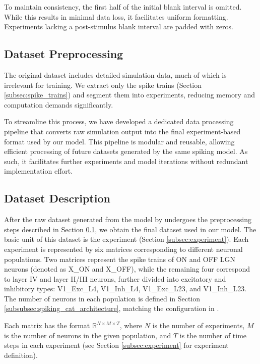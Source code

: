 To maintain consistency, the first half of the initial blank interval is omitted. While this results in minimal data loss, it facilitates uniform formatting. Experiments lacking a post-stimulus blank interval are padded with zeros.

\subsection{Dataset Preprocessing}
\label{subsec:dataset_preprocess}
The original dataset includes detailed simulation data, much of which is irrelevant for training. We extract only the spike trains (Section \ref{subsec:spike_trains}) and segment them into experiments, reducing memory and computation demands significantly.

To streamline this process, we have developed a dedicated data processing pipeline that converts raw simulation output into the final experiment-based format used by our model. This pipeline is modular and reusable, allowing efficient processing of future datasets generated by the same spiking model. As such, it facilitates further experiments and model iterations without redundant implementation effort.

\subsection{Dataset Description}
\label{subsec:dataset_description}

After the raw dataset generated from the model by \citet{antolik2024comprehensive} undergoes the preprocessing steps described in Section \ref{subsec:dataset_preprocess}, we obtain the final dataset used in our model. The basic unit of this dataset is the experiment (Section \ref{subsec:experiment}). Each experiment is represented by six matrices corresponding to different neuronal populations. Two matrices represent the spike trains of ON and OFF LGN neurons (denoted as X\_ON and X\_OFF), while the remaining four correspond to layer IV and layer II/III neurons, further divided into excitatory and inhibitory types: V1\_Exc\_L4, V1\_Inh\_L4, V1\_Exc\_L23, and V1\_Inh\_L23. The number of neurons in each population is defined in Section \ref{subsubsec:spiking_cat_architecture}, matching the configuration in \citet{antolik2024comprehensive}.

Each matrix has the format $\mathbb{R}^{N \times M \times T}$, where $N$ is the number of experiments, $M$ is the number of neurons in the given population, and $T$ is the number of time steps in each experiment (see Section \ref{subsec:experiment} for experiment definition).

